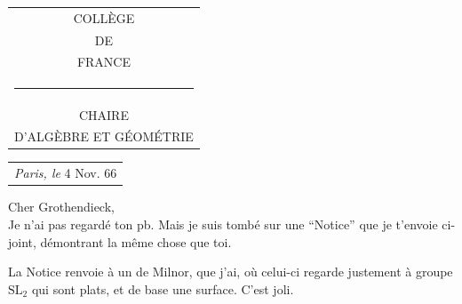 \noindent\begin{tabular}[t]{c}
COLLÈGE\\
DE\\
FRANCE\\
\rule{1.8em}{0.5pt}\\
CHAIRE\\
D’ALGÈBRE ET GÉOMÉTRIE
\end{tabular}\hfill
\begin{tabular}[t]{l}
\textit{Paris, le} 4 Nov. 66\\
\end{tabular}

Cher Grothendieck,\\

Je n’ai pas regardé ton pb. Mais je suis tombé sur une ``Notice'' que je t’envoie ci-joint, démontrant la même chose que toi.

La Notice renvoie à un  de Milnor, que j’ai, où celui-ci regarde justement  à groupe $\mathrm{SL}_{2}$ qui sont plats, et de base une surface. C’est  joli.

